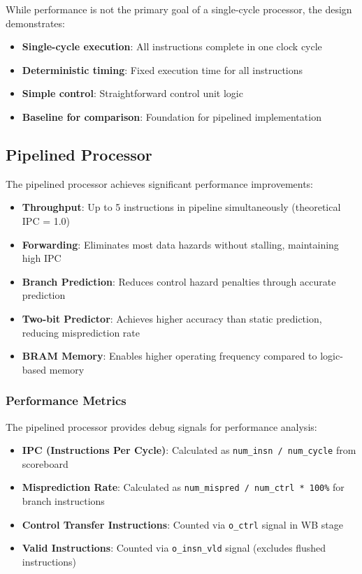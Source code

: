 While performance is not the primary goal of a single-cycle processor, the design demonstrates:

\begin{itemize}
    \item \textbf{Single-cycle execution}: All instructions complete in one clock cycle
    \item \textbf{Deterministic timing}: Fixed execution time for all instructions
    \item \textbf{Simple control}: Straightforward control unit logic
    \item \textbf{Baseline for comparison}: Foundation for pipelined implementation
\end{itemize}

\subsection{Pipelined Processor}

The pipelined processor achieves significant performance improvements:

\begin{itemize}
    \item \textbf{Throughput}: Up to 5 instructions in pipeline simultaneously (theoretical IPC = 1.0)
    \item \textbf{Forwarding}: Eliminates most data hazards without stalling, maintaining high IPC
    \item \textbf{Branch Prediction}: Reduces control hazard penalties through accurate prediction
    \item \textbf{Two-bit Predictor}: Achieves higher accuracy than static prediction, reducing misprediction rate
    \item \textbf{BRAM Memory}: Enables higher operating frequency compared to logic-based memory
\end{itemize}

\subsubsection{Performance Metrics}

The pipelined processor provides debug signals for performance analysis:

\begin{itemize}
    \item \textbf{IPC (Instructions Per Cycle)}: Calculated as \texttt{num\_insn / num\_cycle} from scoreboard
    \item \textbf{Misprediction Rate}: Calculated as \texttt{num\_mispred / num\_ctrl * 100\%} for branch instructions
    \item \textbf{Control Transfer Instructions}: Counted via \texttt{o\_ctrl} signal in WB stage
    \item \textbf{Valid Instructions}: Counted via \texttt{o\_insn\_vld} signal (excludes flushed instructions)
\end{itemize}

